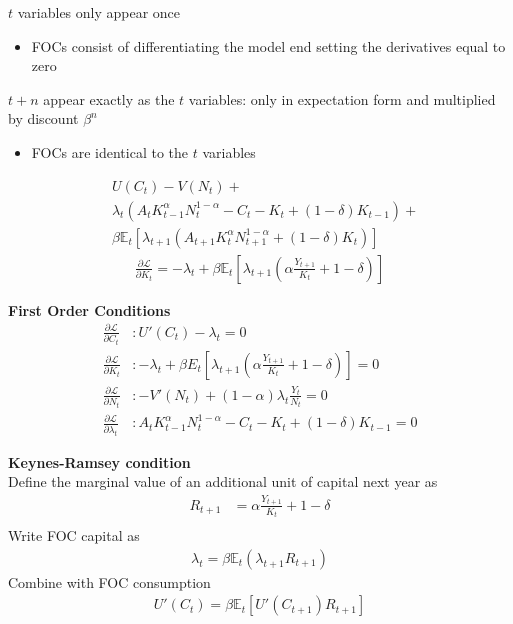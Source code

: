 \documentclass{beamer}
\begin{document}
\begin{frame}
   $t$ variables only appear once
  \begin{itemize}
  \item FOCs consist of differentiating the model end setting the derivatives equal to zero  
\end{itemize}
\medskip
$t+n$ appear exactly as the $t$ variables: only in expectation form and multiplied by discount $\beta^n$
\begin{itemize}
  \item FOCs are identical to the $t$ variables
\end{itemize}
\begin{align}
  & U(C_t)-V(N_t) + \\ \nonumber
  & \lambda_t(A_tK^\alpha_{t-1}N^{1-\alpha}_t -C_t -K_t + (1-\delta)K_{t-1}) + \\ \nonumber
  & \beta \mathbb{E}_t[\lambda_{t+1}(A_{t+1}K^\alpha_{t}N^{1-\alpha}_{t+1}+(1-\delta)K_t)]
\end{align}
\begin{align}
  \frac{\partial \mathcal{L}}{\partial K_t}=-\lambda_t + \beta \mathbb{E}_t\left[\lambda_{t+1} \left( \alpha\frac{Y_{t+1}}{K_t}+1-\delta \right) \right]
\end{align}
\end{frame}

\begin{frame}
  \textbf{First Order Conditions}  
\begin{align}
  \frac{\partial \mathcal{L}}{\partial C_t}&: U'(C_t)-\lambda_t=0\\
  \frac{\partial \mathcal{L}}{\partial K_t}&: -\lambda_t + \beta E_t\left[\lambda_{t+1} \left( \alpha\frac{Y_{t+1}}{K_t}+1-\delta \right) \right] =0\\
  \frac{\partial \mathcal{L}}{\partial N_t}&: -V'(N_t) + (1-\alpha) \lambda_t \frac{Y_t}{N_t}=0\\
  \frac{\partial \mathcal{L}}{\partial \lambda_t}&: A_tK^\alpha_{t-1}N^{1-\alpha}_t - C_t - K_t + (1-\delta)K_{t-1} =0
\end{align}
\end{frame}

\begin{frame}
 \textbf{Keynes-Ramsey condition}\\
 Define the marginal value of an additional unit of capital next year as
\begin{align}
  R_{t+1}&= \alpha \frac{Y_{t+1}}{K_t}+1-\delta\\    
\end{align}
Write FOC capital as
\begin{align}
  \lambda_t=\beta \mathbb{E}_t(\lambda_{t+1}R_{t+1})
\end{align}
Combine with FOC consumption
\begin{align}
  U'(C_t)= \beta \mathbb{E}_t[U'(C_{t+1})R_{t+1}]
\end{align}
\end{frame}
\end{document}

